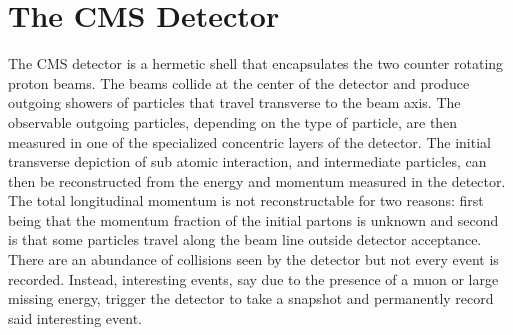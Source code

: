 


\section{The CMS Detector}

The CMS detector is a hermetic shell that encapsulates the two counter rotating proton beams. The beams collide at the center of the detector and produce outgoing showers of particles that travel transverse to the beam axis. The observable outgoing particles, depending on the type of particle, are then measured in one of the specialized concentric layers of the detector. The initial transverse depiction of sub atomic interaction, and intermediate particles, can then be reconstructed from the energy and momentum measured in the detector. The total longitudinal momentum is not reconstructable for two reasons: first being that the momentum fraction of the initial partons is unknown and second is that some particles travel along the beam line outside detector acceptance.  There are an abundance of collisions seen by the detector but not every event is recorded. Instead, interesting events, say due to the presence of a muon or large missing energy, trigger the detector to take a snapshot and permanently record said interesting event.

